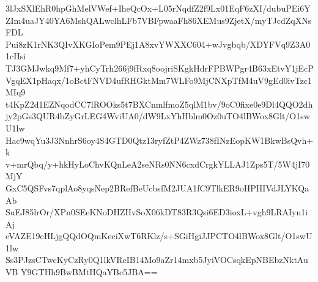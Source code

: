 3lJxSXlEhR0hpGhMelVWef+IheQcOx+L05rNqdfZ2f9Lx01EqF6zXI/dubuPEi6Y
ZIm4uaJY40YA6MshQALwclhLFb7VBFpwaaFh86XEMus9ZjetX/myTJcdZqXNsFDL
Pui8zK1rNK3QIvXKGIoPem9PEj1A8xvYWXXC604+wJvgbqb/XDYFVq9Z3A01cHsi
TJ3GMJwkq9Mf7+yhCyTrh266j9fRxq8oojriSKgkHdrFPBWPgr4B63xEtvY1jEcP
VgqEX1pHaqx/1oBctFNVD4ufRHGktMm7WLFo9MjCNXpTfM4uV9gEd0ivTzc1MIq9
t4KpZ2d1EZNqodCC7lROOks5t7BXCnmlfmoZ5qlM1bv/9oC0fixe0e9Dl4QQO2dh
jy2pGs3QUR4bZyGrLEG4WviUA0/dW9LxYhHblm0Oz0uTO4lBWox8Glt/O1swU1lw
Hac9wqYu3J3NnhrS6oy4S4GTD0Qtz13ryfZtP4ZWz738fINzEopKW1BkwBsQvh+k
v+mrQbq/y+hkHyLoChvKQnLeA2seNRs0NN6cxdCrgkYLLAJ1Zps5T/5W4jI70MjY
GxC5QSFvs7qplAo8yqsNep2BRefBeUcbsfM2JUA1fC9TlkER9oHPHIVdJLYKQaAb
SuEJ85lrOr/XPn0SEeKNoDHZHvSoX06kDT83R3Qsi6ED3ioxL+vgh9LRAIyn1iAj
eVAZE19eHLjgQQdOQmKeciXwT6RKlz/s+SGiHgiJJPCTO4lBWox8Glt/O1swU1lw
Ss3PJzsCTwcKyCzRy0Q1lkVRcIB14Mo9aZr14mxb5JyiVOCsqkEpNBEbzNktAuVB
Y9GTHh9BwBMtHQaYBc5JBA==
